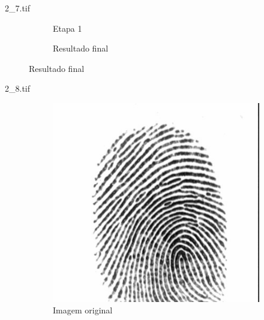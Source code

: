 \documentclass{beamer}
\begin{document}
\begin{frame}{2\_7.tif}
\begin{figure}
\begin{subfigure}[!ht]{0.32\textwidth}
                \caption{Etapa 1}
            \end{subfigure}
            \begin{subfigure}[!ht]{0.32\textwidth}
                \caption{Resultado final}
            \end{subfigure}
        \end{figure}
    \end{frame}

    \begin{frame}{2\_8.tif}
        \begin{figure}
            \centering
            \begin{subfigure}[!ht]{0.32\textwidth}
                \includegraphics[width=\columnwidth]{Fingerprints/2_8.jpg}
                \caption{Imagem original}
            \end{subfigure}
            \begin{subfigure}[!ht]{0.32\textwidth}

\end{subfigure}
\end{figure}
\end{frame}
\end{document}
